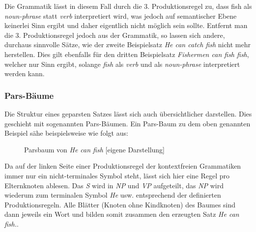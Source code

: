 \documentclass[12pt]{report}
\begin{document}
Die Grammatik lässt in diesem Fall durch die 3. Produktionsregel zu, dass \glqq  fish\grqq{} als \textit{noun-phrase} statt \textit{verb} interpretiert wird, was jedoch auf semantischer Ebene keinerlei Sinn ergibt und daher eigentlich nicht möglich sein sollte. Entfernt man die 3. Produktionsregel jedoch aus der Grammatik, so lassen sich andere, durchaus sinnvolle Sätze, wie der zweite Beispielsatz \textit{\glqq  He can catch fish\grqq{}} nicht mehr herstellen. Dies gilt ebenfalls für den dritten Beispielsatz \textit{\glqq  Fishermen can fish fish\grqq{}}, welcher nur Sinn ergibt, solange \textit{\glqq  fish\grqq{}} als \textit{verb} und als \textit{noun-phrase} interpretiert werden kann.

\subsubsection{Pars-Bäume}
Die Struktur eines geparsten Satzes lässt sich auch übersichtlicher darstellen. Dies geschieht mit sogenannten Pars-Bäumen. Ein Pars-Baum zu dem oben genannten Beispiel sähe beispielsweise wie folgt aus:
\begin{figure}[h!]
\begin{center}
\caption{Parsbaum von \textit{\glqq  He can fish\grqq{}} [eigene Darstellung]}
\end{center}
\end{figure}

Da auf der linken Seite einer Produktionsregel der kontextfreien Grammatiken immer nur ein nicht-terminales Symbol steht, lässt sich hier eine Regel pro Elternknoten ablesen. Das \textit{S} wird in \textit{NP} und \textit{VP} aufgeteilt, das \textit{NP} wird wiederum zum terminalen Symbol \textit{\glqq  He\grqq{}} usw. entsprechend der definierten Produktionsregeln. Alle Blätter (Knoten ohne Kindknoten) des Baumes sind dann jeweils ein Wort und bilden somit zusammen den erzeugten Satz \textit{\glqq  He can fish.\grqq{}}. 
\end{document}
